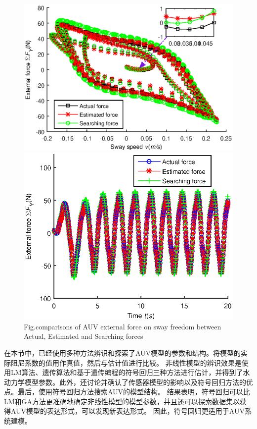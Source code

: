 \begin{figure}[!htp]
\centering
\includegraphics[width=14cm]{figure/chap3/search_compare.eps}
\includegraphics[width=14cm]{figure/chap3/time-force_compare.eps}
\label{fig:chap3:F8}
 {Fig.}{comparisons of AUV external force on sway freedom between Actual, Estimated and Searching forces}
\end{figure}

在本节中，已经使用多种方法辨识和探索了AUV模型的参数和结构。将模型的实际阻尼系数的值用作真值，然后与估计值进行比较。 非线性模型的辨识效果是使用LM算法、遗传算法和基于遗传编程的符号回归三种方法进行估计，并得到了水动力学模型参数。此外，还讨论并确认了传感器模型的影响以及符号回归方法的优点。最后，使用符号回归方法搜索AUV的模型结构。 结果表明，符号回归可以比LM和GA方法更准确地确定非线性模型的模型参数，并且还可以探索数据集以获得AUV模型的表达形式，可以发现新表达形式。 因此，符号回归更适用于AUV系统建模。


